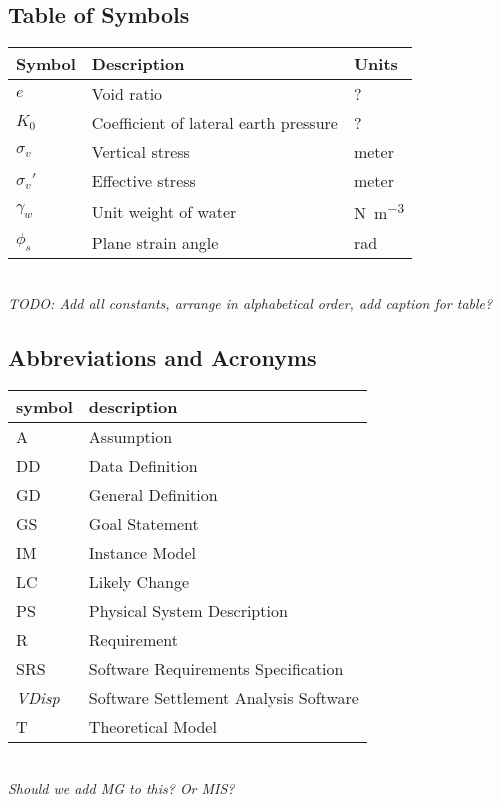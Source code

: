 \documentclass[12pt]{article}
\begin{document}
\subsection{Table of Symbols}

\noindent \begin{tabular}{l p{12cm} l} 
  \toprule		
  \textbf{Symbol} & \textbf{Description} & \textbf{Units}\\
  \midrule 
  $e$ & Void ratio & ? \\
  $K_0$ & Coefficient of lateral earth pressure & ?\\
  $\sigma_v$ & Vertical stress & meter\\
  $\sigma_{v}'$ & Effective stress & meter\\
  $\gamma_w$ & Unit weight of water & \si{\newton\per\cubic\metre} \\
  $\phi_s$ & Plane strain angle & \si{\radian}\\
  \bottomrule
\end{tabular}
\\
\emph{TODO: Add all constants, arrange in alphabetical order, add caption for table?}
\subsection{Abbreviations and Acronyms}

\renewcommand{\arraystretch}{1.2}
\begin{tabular}{l l} 
  \toprule		
  \textbf{symbol} & \textbf{description}\\
  \midrule 
  A & Assumption\\
  DD & Data Definition\\
  GD & General Definition\\
  GS & Goal Statement\\
  IM & Instance Model\\
  LC & Likely Change\\
  PS & Physical System Description\\
  R & Requirement\\
  SRS & Software Requirements Specification\\
  \emph{VDisp} & Software Settlement Analysis Software\\
  T & Theoretical Model\\
  \bottomrule
\end{tabular}\\

\emph{Should we add MG to this? Or MIS?}
\end{document}
